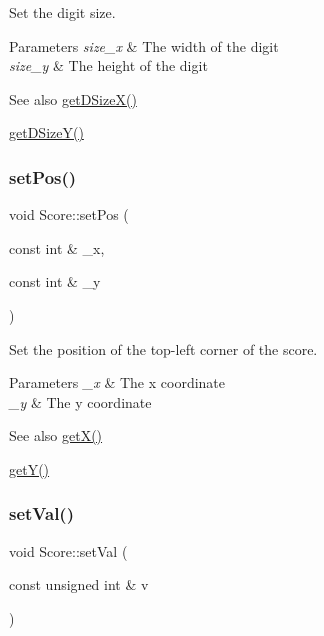 Set the digit size. 


\begin{DoxyParams}{Parameters}
{\em size\+\_\+x} & The width of the digit \\
\hline
{\em size\+\_\+y} & The height of the digit \\
\hline
\end{DoxyParams}
\begin{DoxySeeAlso}{See also}
\mbox{\hyperlink{class_score_a5c4891bd7ea2e4baefe364a5bc281861}{get\+D\+Size\+X()}} 

\mbox{\hyperlink{class_score_ae7da6b9ad72bb407098a37aecc085d28}{get\+D\+Size\+Y()}} 
\end{DoxySeeAlso}
\mbox{\label{class_score_aeb5434203cfadb9a9c679d9481ae939a}} 
\subsubsection{\texorpdfstring{set\+Pos()}{setPos()}}
{\footnotesize\ttfamily void Score\+::set\+Pos (\begin{DoxyParamCaption}\item[{const int \&}]{\+\_\+x,  }\item[{const int \&}]{\+\_\+y }\end{DoxyParamCaption})\hspace{0.3cm}{\ttfamily [inline]}}



Set the position of the top-\/left corner of the score. 


\begin{DoxyParams}{Parameters}
{\em \+\_\+x} & The x coordinate \\
\hline
{\em \+\_\+y} & The y coordinate \\
\hline
\end{DoxyParams}
\begin{DoxySeeAlso}{See also}
\mbox{\hyperlink{class_score_aaae02b51a637062330b3259952974ae8}{get\+X()}} 

\mbox{\hyperlink{class_score_a669f6def2fbf922750ce054a0fd0b915}{get\+Y()}} 
\end{DoxySeeAlso}
\mbox{\label{class_score_a7327b27227ff3a060036a387d9df81f4}} 
\subsubsection{\texorpdfstring{set\+Val()}{setVal()}}
{\footnotesize\ttfamily void Score\+::set\+Val (\begin{DoxyParamCaption}\item[{const unsigned int \&}]{v }\end{DoxyParamCaption})\hspace{0.3cm}{\ttfamily [inline]}}

